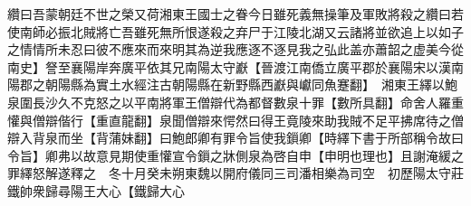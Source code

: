 纘曰吾蒙朝廷不世之榮又荷湘東王國士之眷今日雖死義無操筆及軍敗將殺之纘曰若使南師必振北賊將亡吾雖死無所恨遂殺之弃尸于江陵北湖又云諸將並欲追上以如子之情情所未忍曰彼不應來而來明其為逆我應逐不逐見我之弘此盖亦蕭韶之虚美今從南史】詧至襄陽岸奔廣平依其兄南陽太守巚【晉渡江南僑立廣平郡於襄陽宋以漢南陽郡之朝陽縣為實土水經注古朝陽縣在新野縣西巚與巘同魚蹇翻】　湘東王繹以鮑泉圍長沙久不克怒之以平南將軍王僧辯代為都督數泉十罪【數所具翻】命舍人羅重懽與僧辯偕行【重直龍翻】泉聞僧辯來愕然曰得王竟陵來助我賊不足平拂席待之僧辯入背泉而坐【背蒲妹翻】曰鮑郎卿有罪令旨使我鎻卿【時繹下書于所部稱令故曰令旨】卿弗以故意見期使重懽宣令鎻之牀側泉為啓自申【申明也理也】且謝淹緩之罪繹怒解遂釋之　冬十月癸未朔東魏以開府儀同三司潘相樂為司空　初歷陽太守莊鐵帥衆歸尋陽王大心【鐵歸大心